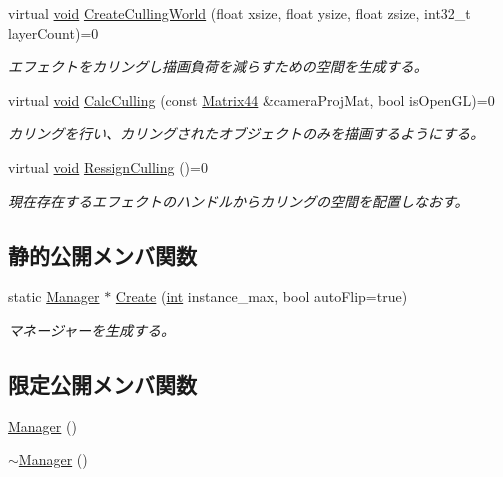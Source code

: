 \begin{DoxyCompactItemize}
virtual \mbox{\hyperlink{namespace_effekseer_ab34c4088e512200cf4c2716f168deb56}{void}} \mbox{\hyperlink{class_effekseer_1_1_manager_a38e954ce0e584f2830d90b5d7763614b}{Create\+Culling\+World}} (float xsize, float ysize, float zsize, int32\+\_\+t layer\+Count)=0
\begin{DoxyCompactList}\small\item\em エフェクトをカリングし描画負荷を減らすための空間を生成する。 \end{DoxyCompactList}\item 
virtual \mbox{\hyperlink{namespace_effekseer_ab34c4088e512200cf4c2716f168deb56}{void}} \mbox{\hyperlink{class_effekseer_1_1_manager_a95c20ca6352c0e68a6fa1d271bcabc1f}{Calc\+Culling}} (const \mbox{\hyperlink{struct_effekseer_1_1_matrix44}{Matrix44}} \&camera\+Proj\+Mat, bool is\+Open\+GL)=0
\begin{DoxyCompactList}\small\item\em カリングを行い、カリングされたオブジェクトのみを描画するようにする。 \end{DoxyCompactList}\item 
virtual \mbox{\hyperlink{namespace_effekseer_ab34c4088e512200cf4c2716f168deb56}{void}} \mbox{\hyperlink{class_effekseer_1_1_manager_a15bf6eee981b682ed35b7660e8caf435}{Ressign\+Culling}} ()=0
\begin{DoxyCompactList}\small\item\em 現在存在するエフェクトのハンドルからカリングの空間を配置しなおす。 \end{DoxyCompactList}\end{DoxyCompactItemize}
\subsection*{静的公開メンバ関数}
\begin{DoxyCompactItemize}
\item 
static \mbox{\hyperlink{class_effekseer_1_1_manager}{Manager}} $\ast$ \mbox{\hyperlink{class_effekseer_1_1_manager_a1de74a159f3646d325f49e940e72181c}{Create}} (\mbox{\hyperlink{namespace_effekseer_ace0abf7c2e6947e519ebe8b54cbcc30a}{int}} instance\+\_\+max, bool auto\+Flip=true)
\begin{DoxyCompactList}\small\item\em マネージャーを生成する。 \end{DoxyCompactList}\end{DoxyCompactItemize}
\subsection*{限定公開メンバ関数}
\begin{DoxyCompactItemize}
\item 
\mbox{\hyperlink{class_effekseer_1_1_manager_a95f452d6946c93cece08532dc73e8fa2}{Manager}} ()
\item 
\mbox{\hyperlink{class_effekseer_1_1_manager_a278221f5fd9ef62c4a881f94caac06b3}{$\sim$\+Manager}} ()
\end{DoxyCompactItemize}


